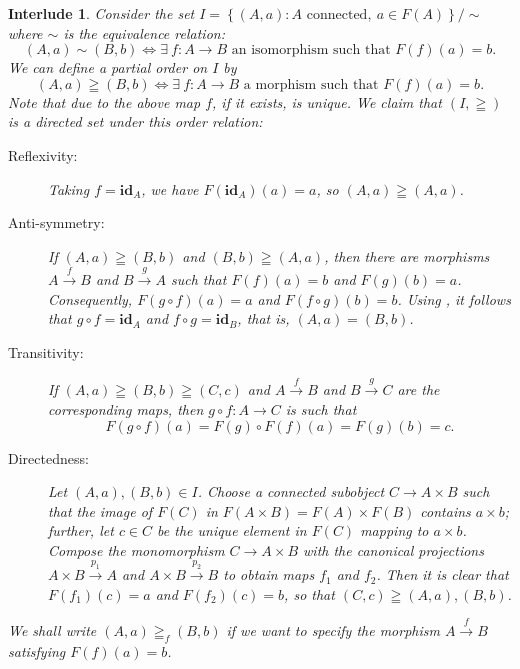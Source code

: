 \documentclass[10pt]{article}
\theoremstyle{thmstyle}
\theoremstyle{defstyle}
\newtheorem{interlude}[theorem]{Interlude}
\newcommand{\id}{\mathbf{id}}
\begin{document}
\begin{interlude}
    Consider the set $I = \left\{(A,a)\colon A\text{ connected}, ~a\in F(A)\right\}/\sim$ where $\sim$ is the equivalence relation: 
    \begin{equation*}
        (A, a)\sim (B, b)\iff\exists~f: A\to B\text{ an isomorphism such that } F(f)(a) = b.
    \end{equation*}
    We can define a partial order on $I$ by 
    \begin{equation*}
        (A, a)\geqq (B, b)\iff\exists~f: A\to B\text{ a morphism such that } F(f)(a) = b.
    \end{equation*}
    Note that due to  the above map $f$, if it exists, is unique. We claim that $(I,\geqq)$ is a directed set under this order relation: 
    \begin{description}
        \item[Reflexivity:] Taking $f = \id_A$, we have $F(\id_A)(a) = a$, so $(A, a)\geqq(A, a)$. 
        \item[Anti-symmetry:]  If $(A, a)\geqq(B, b)$ and $(B, b)\geqq(A, a)$, then there are morphisms $A\xrightarrow{f} B$ and $B\xrightarrow{g} A$ such that $F(f)(a) = b$ and $F(g)(b) = a$. Consequently, $F(g\circ f)(a) = a$ and $F(f\circ g)(b) = b$. Using , it follows that $g\circ f = \id_A$ and $f\circ g = \id_B$, that is, $(A, a) = (B, b)$.
        \item[Transitivity:] If $(A, a)\geqq(B, b)\geqq(C, c)$ and $A\xrightarrow{f} B$ and $B\xrightarrow{g} C$ are the corresponding maps, then $g\circ f: A\to C$ is such that 
        \begin{equation*}
            F(g\circ f)(a) = F(g)\circ F(f)(a) = F(g)(b) = c.
        \end{equation*}
        \item[Directedness:] Let $(A, a), (B, b)\in I$. Choose a connected subobject $C\to A\times B$ such that the image of $F(C)$ in $F(A\times B) = F(A)\times F(B)$ contains $a\times b$; further, let $c\in C$ be the unique element in $F(C)$ mapping to $a\times b$. Compose the monomorphism $C\to A\times B$ with the canonical projections $A\times B\xrightarrow{p_1}A$ and $A\times B\xrightarrow{p_2}B$ to obtain maps $f_1$ and $f_2$. Then it is clear that $F(f_1)(c) = a$ and $F(f_2)(c) = b$, so that $(C, c)\geqq (A, a), (B, b)$.
    \end{description}
    We shall write $(A, a)\geqq_f (B, b)$ if we want to specify the morphism $A\xrightarrow{f} B$ satisfying $F(f)(a) = b$.
\end{interlude}
\end{document}
